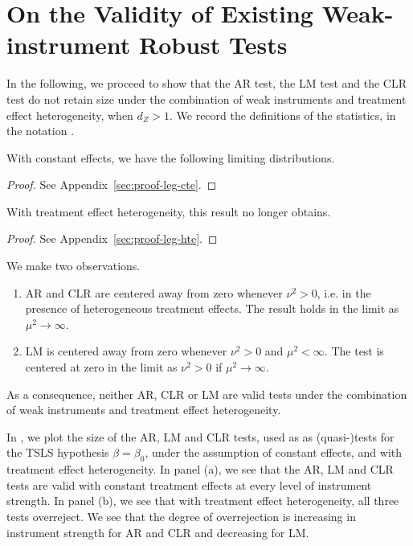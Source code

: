 \section{On the Validity of Existing Weak-instrument Robust Tests}

\label{sec:ar-clr}

In the following, we proceed to show that the \cite{andersonEstimationParametersSingle1949} AR test, the \cite{kleibergenGeneralizingWeakInstrument2007} LM test and the \cite{moreiraConditionalLikelihoodRatio2003} CLR test do not retain size under the combination of weak instruments and treatment effect heterogeneity, when \(d_Z>1\). We record the definitions of the statistics, in the notation \cite{finlayImplementingWeakInstrumentRobust2009}.

\noindent
With constant effects, we have the following limiting distributions.

\begin{proof}
    See Appendix~\ref{sec:proof-leg-cte}.
\end{proof}
\noindent
With treatment effect heterogeneity, this result no longer obtains.

\begin{proof}
    See Appendix~\ref{sec:proof-leg-hte}.
\end{proof}
\begin{remark} 
We make two observations.
\begin{enumerate}
    \item 
    AR and CLR are centered away from zero whenever \(\nu^2>0\), i.e. in the presence of heterogeneous treatment effects. The result holds in the limit as \(\mu^2\to\infty\). 
    \item 
    LM  is centered away from zero whenever \(\nu^2>0\) and \(\mu^2<\infty\). The test is centered at zero in the limit as \(\nu^2>0\) if \(\mu^2\to\infty\).    
\end{enumerate}
As a consequence, neither AR, CLR or LM are valid tests under the combination of weak instruments and treatment effect heterogeneity.
\end{remark}
\noindent 
In , we plot the size of the AR, LM and CLR tests, used as as (quasi-)tests for the TSLS hypothesis  \(\beta=\beta_0\), under the assumption of constant effects, and with treatment effect heterogeneity.
In panel (a), we see that the AR, LM and CLR tests are valid with constant treatment effects at every level of instrument strength. In panel (b), we see that with treatment effect heterogeneity,  all three tests overreject. We see that the degree of overrejection is increasing in instrument strength for AR and CLR and decreasing for LM. 

